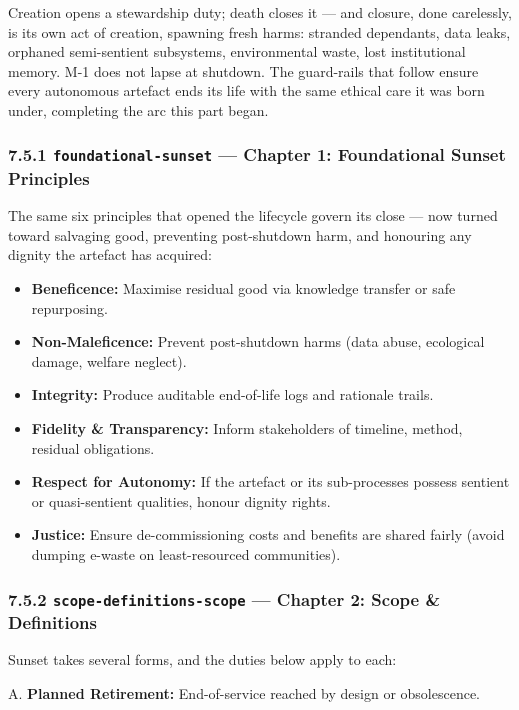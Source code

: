 \documentclass[11pt]{article}
\begin{document}
Creation opens a stewardship duty; death closes it — and closure, done carelessly, is its own act of creation, spawning fresh harms: stranded dependants, data leaks, orphaned semi-sentient subsystems, environmental waste, lost institutional memory. M-1 does not lapse at shutdown. The guard-rails that follow ensure every autonomous artefact ends its life with the same ethical care it was born under, completing the arc this part began.


\subsubsection*{7.5.1 \texttt{foundational-sunset} — Chapter 1: Foundational Sunset Principles}


The same six principles that opened the lifecycle govern its close — now turned toward salvaging good, preventing post-shutdown harm, and honouring any dignity the artefact has acquired:


\begin{itemize}\setlength\itemsep{0pt}
\item \textbf{Beneficence:} Maximise residual good via knowledge transfer or safe repurposing.
\item \textbf{Non-Maleficence:} Prevent post-shutdown harms (data abuse, ecological damage, welfare neglect).
\item \textbf{Integrity:} Produce auditable end-of-life logs and rationale trails.
\item \textbf{Fidelity \& Transparency:} Inform stakeholders of timeline, method, residual obligations.
\item \textbf{Respect for Autonomy:} If the artefact or its sub-processes possess sentient or quasi-sentient qualities, honour dignity rights.
\item \textbf{Justice:} Ensure de-commissioning costs and benefits are shared fairly (avoid dumping e-waste on least-resourced communities).
\end{itemize}


\subsubsection*{7.5.2 \texttt{scope-definitions-scope} — Chapter 2: Scope \& Definitions}


Sunset takes several forms, and the duties below apply to each:


A. \textbf{Planned Retirement:} End-of-service reached by design or obsolescence.
\end{document}
